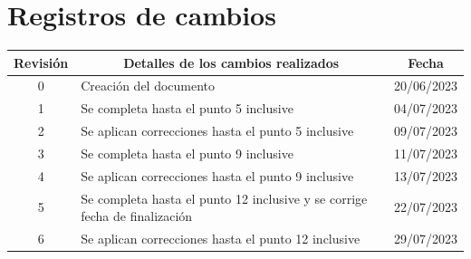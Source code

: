 \documentclass[
11pt, %
]{charter}
\begin{document}
\maketitle
\thispagestyle{empty}
\pagebreak


\thispagestyle{empty}
{\setlength{\parskip}{0pt}
\tableofcontents{}
}
\pagebreak


\section*{Registros de cambios}
\label{sec:registro}


\begin{table}[ht]
\label{tab:registro}
\centering
\begin{tabularx}{\linewidth}{@{}|c|X|c|@{}}
\hline
\rowcolor[HTML]{C0C0C0} 
Revisión & \multicolumn{1}{c|}{\cellcolor[HTML]{C0C0C0}Detalles de los cambios realizados} & Fecha      \\ \hline
0      & Creación del documento                                 & 20/06/2023 \\ \hline
1      & Se completa hasta el punto 5 inclusive                 & 04/07/2023 \\ \hline
2          & Se aplican correcciones hasta el punto 5 inclusive                  & 09/07/2023 \\ \hline
3          & Se completa hasta el punto 9 inclusive                 & 11/07/2023 \\ \hline
4          & Se aplican correcciones hasta el punto 9 inclusive                & 13/07/2023 \\ \hline
5          & Se completa hasta el punto 12 inclusive y se corrige fecha de finalización & 22/07/2023 \\ \hline
6          & Se aplican correcciones hasta el punto 12 inclusive & 29/07/2023 \\ \hline

\end{tabularx}
\end{table}
\end{document}
